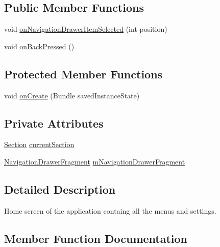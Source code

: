 \subsection*{Public Member Functions}
\begin{DoxyCompactItemize}
\item 
void \hyperlink{classorg_1_1buildmlearn_1_1toolkit_1_1activity_1_1HomeActivity_af75c80f626f8c3a7141c046108ff229f}{on\+Navigation\+Drawer\+Item\+Selected} (int position)
\item 
void \hyperlink{classorg_1_1buildmlearn_1_1toolkit_1_1activity_1_1HomeActivity_af8fd4c02b236b2dd1e51cf14fca78362}{on\+Back\+Pressed} ()
\end{DoxyCompactItemize}
\subsection*{Protected Member Functions}
\begin{DoxyCompactItemize}
\item 
void \hyperlink{classorg_1_1buildmlearn_1_1toolkit_1_1activity_1_1HomeActivity_a84a92cce3842759b4e3c18ecefbe2ced}{on\+Create} (Bundle saved\+Instance\+State)
\end{DoxyCompactItemize}
\subsection*{Private Attributes}
\begin{DoxyCompactItemize}
\item 
\hyperlink{enumorg_1_1buildmlearn_1_1toolkit_1_1model_1_1Section}{Section} \hyperlink{classorg_1_1buildmlearn_1_1toolkit_1_1activity_1_1HomeActivity_ab4c37abd0b73d06bcb29ff53cc0d894c}{current\+Section}
\item 
\hyperlink{classorg_1_1buildmlearn_1_1toolkit_1_1fragment_1_1NavigationDrawerFragment}{Navigation\+Drawer\+Fragment} \hyperlink{classorg_1_1buildmlearn_1_1toolkit_1_1activity_1_1HomeActivity_a96725cb6e809c106369d5622bdafba9a}{m\+Navigation\+Drawer\+Fragment}
\end{DoxyCompactItemize}


\subsection{Detailed Description}
Home screen of the application containg all the menus and settings. 

\subsection{Member Function Documentation}
